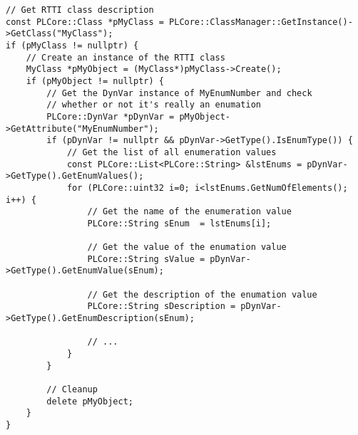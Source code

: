 \begin{lstlisting}[label=Code:RTTIDynamicUsageOfDynTypeInfoForEnumerationInformation,caption={Dynamic usage of \emph{PLCore::DynTypeInfo} for enumeration information}]
// Get RTTI class description
const PLCore::Class *pMyClass = PLCore::ClassManager::GetInstance()->GetClass("MyClass");
if (pMyClass != nullptr) {
	// Create an instance of the RTTI class
	MyClass *pMyObject = (MyClass*)pMyClass->Create();
	if (pMyObject != nullptr) {
		// Get the DynVar instance of MyEnumNumber and check
		// whether or not it's really an enumation
		PLCore::DynVar *pDynVar = pMyObject->GetAttribute("MyEnumNumber");
		if (pDynVar != nullptr && pDynVar->GetType().IsEnumType()) {
			// Get the list of all enumeration values
			const PLCore::List<PLCore::String> &lstEnums = pDynVar->GetType().GetEnumValues();
			for (PLCore::uint32 i=0; i<lstEnums.GetNumOfElements(); i++) {
				// Get the name of the enumeration value
				PLCore::String sEnum  = lstEnums[i];

				// Get the value of the enumation value
				PLCore::String sValue = pDynVar->GetType().GetEnumValue(sEnum);

				// Get the description of the enumation value
				PLCore::String sDescription = pDynVar->GetType().GetEnumDescription(sEnum);

				// ...
			}
		}

		// Cleanup
		delete pMyObject;
	}
}
\end{lstlisting}



